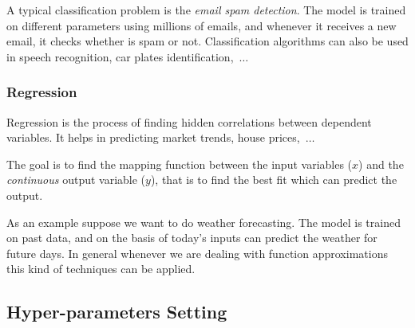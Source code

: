 A typical classification problem is the \emph{email spam detection}. The model is trained on different parameters using millions of emails, and whenever it receives a new email, it checks whether is spam or not. Classification algorithms can also be used in speech recognition, car plates identification,~$\ldots$

\subsubsection{Regression}
\label{regression}

Regression is the process of finding hidden correlations between dependent variables. It helps in predicting market trends, house prices,~$\ldots$

The goal is to find the mapping function between the input variables ($x$) and the \emph{continuous} output variable ($y$), that is to find the best fit which can predict the output.

As an example suppose we want to do weather forecasting. The model is trained on past data, and on the basis of today's inputs can predict the weather for future days. In general whenever we are dealing with function approximations this kind of techniques can be applied.

\subsection{Hyper-parameters Setting}
\label{neural-network-design}

%
%

